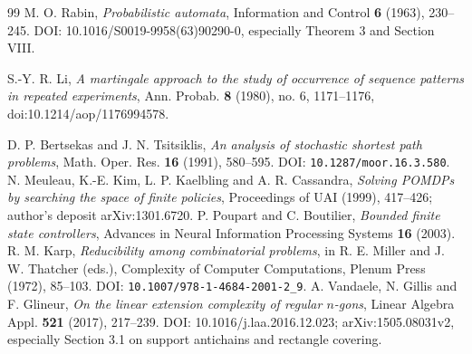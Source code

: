 \begin{thebibliography}{99}
 M. O. Rabin, \emph{Probabilistic automata},
Information and Control \textbf{6} (1963), 230--245.
DOI: 10.1016/S0019-9958(63)90290-0, especially Theorem 3 and Section VIII.

S.-Y. R. Li, \emph{A martingale approach to the study of occurrence of
sequence patterns in repeated experiments}, Ann. Probab. \textbf{8}
(1980), no. 6, 1171--1176, doi:10.1214/aop/1176994578.


 D. P. Bertsekas and J. N. Tsitsiklis,
\emph{An analysis of stochastic shortest path problems},
Math. Oper. Res. \textbf{16} (1991), 580--595.
DOI: \texttt{10.1287/moor.16.3.580}.
 N. Meuleau, K.-E. Kim, L. P. Kaelbling and A. R. Cassandra,
\emph{Solving POMDPs by searching the space of finite policies},
Proceedings of UAI (1999), 417--426; author's deposit arXiv:1301.6720.
 P. Poupart and C. Boutilier,
\emph{Bounded finite state controllers},
Advances in Neural Information Processing Systems \textbf{16} (2003).
 R. M. Karp,
\emph{Reducibility among combinatorial problems},
in R. E. Miller and J. W. Thatcher (eds.), Complexity of Computer
Computations, Plenum Press (1972), 85--103.
DOI: \texttt{10.1007/978-1-4684-2001-2\_9}.
 A. Vandaele, N. Gillis and F. Glineur,
\emph{On the linear extension complexity of regular $n$-gons},
Linear Algebra Appl. \textbf{521} (2017), 217--239.
DOI: 10.1016/j.laa.2016.12.023; arXiv:1505.08031v2,
especially Section 3.1 on support antichains and rectangle covering.

\end{thebibliography}
